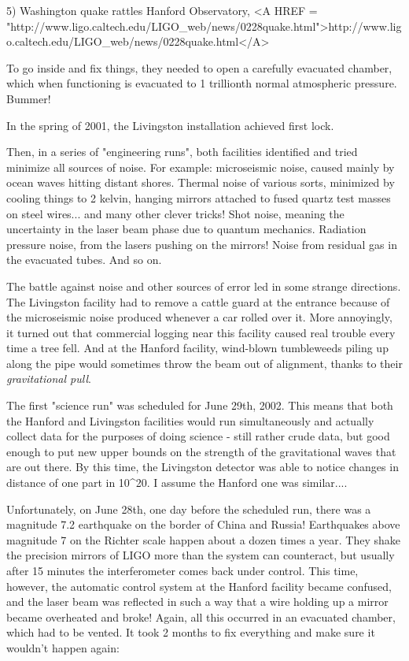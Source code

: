 5) Washington quake rattles Hanford Observatory,
<A HREF = "http://www.ligo.caltech.edu/LIGO_web/news/0228quake.html">http://www.ligo.caltech.edu/LIGO_web/news/0228quake.html</A>

To go inside and fix things, they needed to open a carefully evacuated
chamber, which when functioning is evacuated to 1 trillionth normal
atmospheric pressure.  Bummer!

In the spring of 2001, the Livingston installation achieved first lock.

Then, in a series of "engineering runs", both facilities
identified and tried minimize all sources of noise.  For example:
microseismic noise, caused mainly by ocean waves hitting distant shores.
Thermal noise of various sorts, minimized by cooling things to 2 kelvin,
hanging mirrors attached to fused quartz test masses on steel
wires... and many other clever tricks!  Shot noise, meaning the
uncertainty in the laser beam phase due to quantum mechanics.  Radiation
pressure noise, from the lasers pushing on the mirrors!  Noise from
residual gas in the evacuated tubes.  And so on.

The battle against noise and other sources of error led in some strange
directions.  The Livingston facility had to remove a cattle guard at the
entrance because of the microseismic noise produced whenever a car
rolled over it.  More annoyingly, it turned out that commercial logging
near this facility caused real trouble every time a tree fell.  And at
the Hanford facility, wind-blown tumbleweeds piling up along the pipe
would sometimes throw the beam out of alignment, thanks to their
\emph{gravitational pull}.

The first "science run" was scheduled for June 29th, 2002.
This means that both the Hanford and Livingston facilities would run
simultaneously and actually collect data for the purposes of doing
science - still rather crude data, but good enough to put new upper
bounds on the strength of the gravitational waves that are out there.
By this time, the Livingston detector was able to notice changes in
distance of one part in 10^{20}.  I assume the Hanford one was
similar....

Unfortunately, on June 28th, one day before the scheduled run, there 
was a magnitude 7.2 earthquake on the border of China and Russia!
Earthquakes above magnitude 7 on the Richter scale happen about a dozen
times a year.  They shake the precision mirrors of LIGO more than the
system can counteract, but usually after 15 minutes the interferometer
comes back under control.  This time, however, the automatic control
system at the Hanford facility became confused, and the laser beam was
reflected in such a way that a wire holding up a mirror became
overheated and broke!  Again, all this occurred in an evacuated chamber,
which had to be vented.  It took 2 months to fix everything and make
sure it wouldn't happen again:

